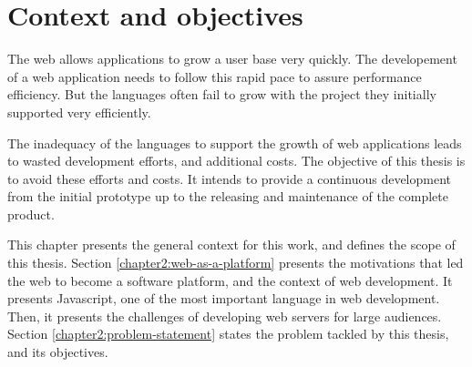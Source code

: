 \chapter{Context and objectives} \label{chapter2}
\minitoc
\eject

The web allows applications to grow a user base very quickly.
The developement of a web application needs to follow this rapid pace to assure performance efficiency.
But the languages often fail to grow with the project they initially supported very efficiently.

The inadequacy of the languages to support the growth of web applications leads to wasted development efforts, and additional costs.
The objective of this thesis is to avoid these efforts and costs.
It intends to provide a continuous development from the initial prototype up to the releasing and maintenance of the complete product.

This chapter presents the general context for this work, and defines the scope of this thesis.
Section \ref{chapter2:web-as-a-platform} presents the motivations that led the web to become a software platform, and the context of web development.
It presents Javascript, one of the most important language in web development.
Then, it presents the challenges of developing web servers for large audiences.
Section \ref{chapter2:problem-statement} states the problem tackled by this thesis, and its objectives.


